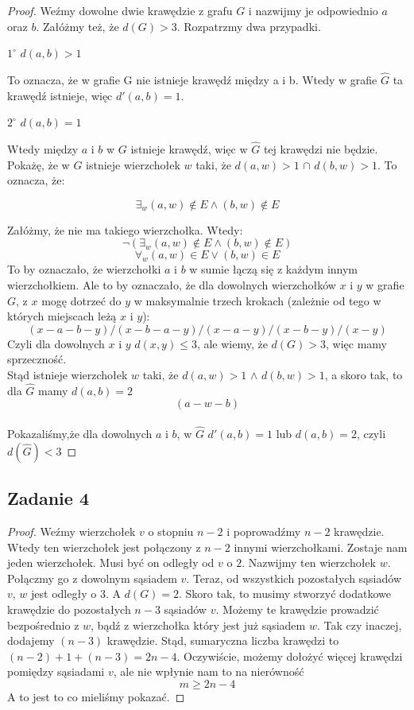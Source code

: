 \documentclass[a4paper]{article}
\begin{document}
\begin{proof}

Weźmy dowolne dwie krawędzie z grafu $G$ i nazwijmy je odpowiednio $a$ oraz $b$. Załóżmy też, że $d(G)>3$. Rozpatrzmy dwa przypadki.

$1^\circ$ $d(a,b)>1$
	
To oznacza, że w grafie G nie istnieje krawędź między a i b. Wtedy w grafie $\hat{G}$ ta krawędź istnieje, więc $d'(a,b)=1$.

$2^\circ$ $d(a,b)=1$

Wtedy między $a$ i $b$ w $G$ istnieje krawędź, więc w $\hat{G}$ tej krawędzi nie będzie. Pokażę, że w $G$ istnieje wierzchołek $w$ taki, że $d(a,w)>1$ $\cap$ $d(b,w)>1$. To oznacza, że:

$$\exists_w (a,w)\not\in E \wedge (b,w) \not\in E$$

Załóżmy, że nie ma takiego wierzchołka. Wtedy:
$$\neg \left(\exists_w (a,w)\not\in E \wedge (b,w) \not\in E\right) $$
$$\forall_w (a,w) \in E \vee (b,w) \in E $$
To by oznaczało, że wierzchołki $a$ i $b$ w sumie łączą się z każdym innym wierzchołkiem. Ale to by oznaczało, że dla dowolnych wierzchołków $x$ i $y$ w grafie $G$, z $x$ mogę dotrzeć do $y$ w maksymalnie trzech krokach (zależnie od tego w których miejscach leżą $x$ i $y$): 
$$(x-a-b-y)/(x-b-a-y)/(x-a-y)/(x-b-y)/(x-y)$$ 
Czyli dla dowolnych $x$ i $y$ $d(x,y)\leq 3$, ale wiemy, że $d(G)>3$, więc mamy sprzeczność.\\
Stąd istnieje wierzchołek $w$ taki, że $d(a,w)>1$ $\wedge$ $d(b,w)>1$, a skoro tak, to dla $\hat{G}$ mamy $d(a,b)=2$ $$(a-w-b)$$\\
Pokazaliśmy,że dla dowolnych $a$ i $b$, w $\hat{G}$ $d'(a,b)=1$ lub $d(a,b)=2$, czyli $d(\hat{G})<3$ 

\end{proof}

\subsection*{Zadanie 4}

\begin{proof}

Weźmy wierzchołek $v$ o stopniu $n-2$ i poprowadźmy $n-2$ krawędzie. Wtedy ten wierzchołek jest połączony z $n-2$ innymi wierzchołkami. Zostaje nam jeden wierzchołek. Musi być on odległy od $v$ o $2$. Nazwijmy ten wierzchołek $w$. Połączmy go z dowolnym sąsiadem $v$. Teraz, od wszystkich pozostałych sąsiadów $v$, $w$ jest odległy o 3. A $d(G)=2$. Skoro tak, to musimy stworzyć dodatkowe krawędzie do pozostałych $n-3$ sąsiadów $v$. Możemy te krawędzie prowadzić bezpośrednio z $w$, bądź z wierzchołka który jest już sąsiadem $w$. Tak czy inaczej, dodajemy $(n-3)$ krawędzie. Stąd, sumaryczna liczba krawędzi to $(n-2)+1+(n-3)=2n-4$. Oczywiście, możemy dołożyć więcej krawędzi pomiędzy sąsiadami $v$, ale nie wpłynie nam to na nierówność $$m\geq 2n-4$$A to jest to co mieliśmy pokazać.

\end{proof}
\end{document}
